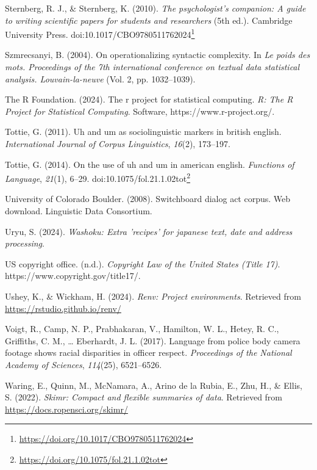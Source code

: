 \documentclass[
  letterpaper,
]{book}
\newlength{\cslhangindent}
\newenvironment{CSLReferences}[2] %
 {\begin{list}{}{%
  \setlength{\itemindent}{0pt}
  \setlength{\leftmargin}{0pt}
  \setlength{\parsep}{0pt}
  \ifodd #1
   \setlength{\leftmargin}{\cslhangindent}
   \setlength{\itemindent}{-1\cslhangindent}
  \fi
  \setlength{\itemsep}{#2\baselineskip}}}
 {\end{list}}
\theoremstyle{definition}
\theoremstyle{remark}
\DeclareRobustCommand{\href}[2]{#2\footnote{\url{#1}}}
\begin{document}
\begin{CSLReferences}{1}{0}
Sternberg, R. J., \& Sternberg, K. (2010). \emph{The psychologist's
companion: A guide to writing scientific papers for students and
researchers} (5th ed.). Cambridge University Press.
doi:\href{https://doi.org/10.1017/CBO9780511762024}{10.1017/CBO9780511762024}

Szmrecsanyi, B. (2004). On operationalizing syntactic complexity. In
\emph{Le poids des mots. Proceedings of the 7th international conference
on textual data statistical analysis. Louvain-la-neuve} (Vol. 2, pp.
1032--1039).

The R Foundation. (2024). The r project for statistical computing.
\emph{R: The R Project for Statistical Computing}. Software,
https://www.r-project.org/.

Tottie, G. (2011). Uh and um as sociolinguistic markers in british
english. \emph{International Journal of Corpus Linguistics},
\emph{16}(2), 173--197.

Tottie, G. (2014). On the use of uh and um in american english.
\emph{Functions of Language}, \emph{21}(1), 6--29.
doi:\href{https://doi.org/10.1075/fol.21.1.02tot}{10.1075/fol.21.1.02tot}

University of Colorado Boulder. (2008). Switchboard dialog act corpus.
Web download. Linguistic Data Consortium.

Uryu, S. (2024). \emph{Washoku: Extra 'recipes' for japanese text, date
and address processing}.

US copyright office. (n.d.). \emph{Copyright Law of the United States
(Title 17)}. https://www.copyright.gov/title17/.

Ushey, K., \& Wickham, H. (2024). \emph{Renv: Project environments}.
Retrieved from \url{https://rstudio.github.io/renv/}

Voigt, R., Camp, N. P., Prabhakaran, V., Hamilton, W. L., Hetey, R. C.,
Griffiths, C. M., \ldots{} Eberhardt, J. L. (2017). Language from police
body camera footage shows racial disparities in officer respect.
\emph{Proceedings of the National Academy of Sciences}, \emph{114}(25),
6521--6526.

Waring, E., Quinn, M., McNamara, A., Arino de la Rubia, E., Zhu, H., \&
Ellis, S. (2022). \emph{Skimr: Compact and flexible summaries of data}.
Retrieved from \url{https://docs.ropensci.org/skimr/}


\end{CSLReferences}
\end{document}
